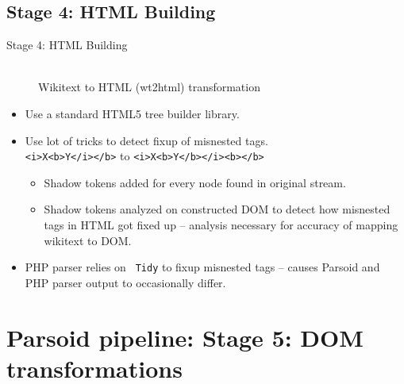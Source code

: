 \documentclass[t,xcolor=dvipsnames]{beamer}
\newcommand{\HTML}[2][\small]{\color{brown} #1{\tt #2}}
\begin{document}
\subsection{Stage 4: HTML Building}
\begin{frame}{Stage 4: HTML Building}
\vspace*{-0.3in}
\begin{center}
\begin{figure}
  \hspace*{-0.3in}
  \\
  {\small Wikitext to HTML (wt2html) transformation}
\end{figure}
\end{center}

\vspace{-1ex}
\begin{itemize}
  \item Use a standard HTML5 tree builder library.
  \item Use lot of tricks to detect fixup of misnested tags. \\
  {\HTML{\tt<i>X<b>Y</i></b>}} to {\HTML{\tt<i>X<b>Y</b></i><b></b>}}
  \begin{itemize}
    \item Shadow tokens added for every node found in original stream.
    \item Shadow tokens analyzed on constructed DOM to detect how misnested tags in HTML got fixed up -- analysis necessary for accuracy of mapping wikitext to DOM.
  \end{itemize}
  \item PHP parser relies on {\tt{\color{Mahogany} Tidy}} to fixup misnested tags -- causes Parsoid and PHP parser output to occasionally differ.
\end{itemize}

\end{frame}

\section{Parsoid pipeline: Stage 5: DOM transformations}
\end{document}
